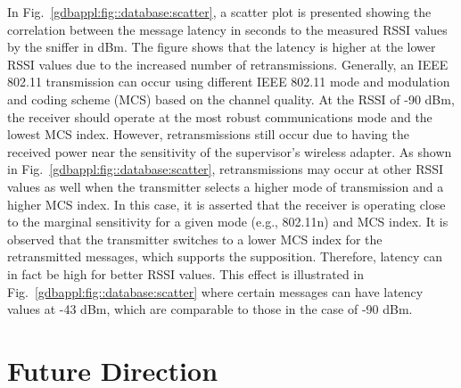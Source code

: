 In Fig.~\ref{gdbappl:fig::database:scatter}, a scatter plot is presented showing the correlation between the message latency in seconds to the measured RSSI values by the sniffer in dBm.  The figure shows that the latency is higher at the lower RSSI values due to the increased number of retransmissions. Generally, an IEEE 802.11 transmission can occur using different IEEE 802.11 mode and modulation and coding scheme (MCS) based on the channel quality. At the RSSI of -90 dBm, the receiver should operate at the most robust communications mode and the lowest MCS index. However, retransmissions still occur due to having the received power near the sensitivity of the supervisor's wireless adapter. As shown in Fig.~\ref{gdbappl:fig::database:scatter}, retransmissions may occur at other RSSI values as well when the transmitter selects a higher mode of transmission and a higher MCS index. In this case, it is asserted that the receiver is operating close to the marginal sensitivity for a given mode (e.g., 802.11n) and MCS index.  It is observed that the transmitter switches to a lower MCS index for the retransmitted messages, which supports the supposition. Therefore, latency can in fact be high for better RSSI values.  This effect is illustrated in Fig.~\ref{gdbappl:fig::database:scatter} where certain messages can have latency values at -43 dBm, which are comparable to those in the case of  -90 dBm.  



\section{Future Direction}

